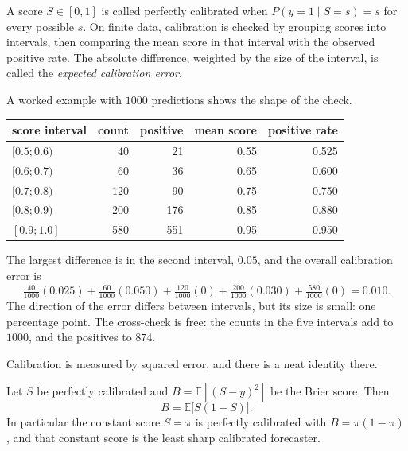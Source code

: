 
\begin{definisi}
A score $S\in[0,1]$ is called perfectly calibrated when $P(y=1\mid S=s)=s$ for every possible $s$.
On finite data, calibration is checked by grouping scores into intervals, then comparing the mean
score in that interval with the observed positive rate. The absolute difference, weighted by the
size of the interval, is called the \emph{expected calibration error}.
\end{definisi}

A worked example with $1000$ predictions shows the shape of the check.

\begin{center}
\small
\begin{tabular}{lrrrr}
\hline
score interval & count & positive & mean score & positive rate \\
\hline
$[0.5;0.6)$ & 40 & 21 & 0.55 & 0.525 \\
$[0.6;0.7)$ & 60 & 36 & 0.65 & 0.600 \\
$[0.7;0.8)$ & 120 & 90 & 0.75 & 0.750 \\
$[0.8;0.9)$ & 200 & 176 & 0.85 & 0.880 \\
$[0.9;1.0]$ & 580 & 551 & 0.95 & 0.950 \\
\hline
\end{tabular}
\end{center}

The largest difference is in the second interval, $0.05$, and the overall calibration error is
\[
\tfrac{40}{1000}(0.025)+\tfrac{60}{1000}(0.050)+\tfrac{120}{1000}(0)
+\tfrac{200}{1000}(0.030)+\tfrac{580}{1000}(0)=0.010 .
\]
The direction of the error differs between intervals, but its size is small: one percentage point.
The cross-check is free: the counts in the five intervals add to $1000$, and the positives to $874$.

Calibration is measured by squared error, and there is a neat identity there.

\begin{proposisi}
Let $S$ be perfectly calibrated and $B=\mathbb{E}[(S-y)^2]$ be the Brier score. Then
\[
B=\mathbb{E}\bigl[S(1-S)\bigr].
\]
In particular the constant score $S=\pi$ is perfectly calibrated with $B=\pi(1-\pi)$, and that
constant score is the least sharp calibrated forecaster.
\end{proposisi}

